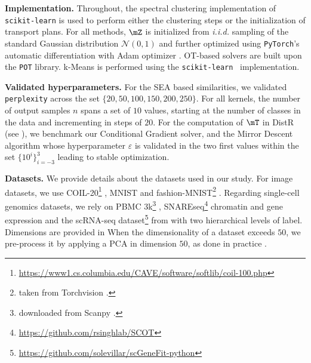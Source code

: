 \textbf{Implementation.} 
Throughout, the spectral clustering implementation of \texttt{scikit-learn} \cite{pedregosa2011scikit} is used to perform either the clustering steps or the initialization of transport plans. 
For all methods, $\mZ$ is initialized from \emph{i.i.d.} sampling of the standard Gaussian distribution $\mathcal{N}(0,1)$ and further optimized using \texttt{PyTorch}'s automatic differentiation \cite{paszke2017automatic} with Adam optimizer \cite{kingma2014adam}. OT-based solvers are built upon the \texttt{POT} \cite{flamary2021pot} library.
k-Means is performed using the \texttt{scikit-learn}~\cite{pedregosa2011scikit} implementation.

\textbf{Validated hyperparameters.} For the SEA based similarities, we validated \texttt{perplexity} across the set $\{20, 50, 100, 150, 200, 250\}$. For all kernels, the number of output samples $n$ spans a set of $10$ values, starting at the number of classes in the data and incrementing in steps of $20$. For the computation of $\mT$ in DistR (see ), we benchmark our Conditional Gradient solver, and the Mirror Descent algorithm whose hyperparameter $\varepsilon$ is validated in the two first values within the set $\{10^{i}\}_{i=-3}^3$ leading to stable optimization.

\textbf{Datasets.}
We provide details about the datasets used in our study. 
For image datasets, we use COIL-20\footnote{\url{https://www1.cs.columbia.edu/CAVE/software/softlib/coil-100.php}} \cite{nene1996columbia}, MNIST and fashion-MNIST\footnote{taken from Torchvision \cite{marcel2010torchvision}.} \cite{xiao2017fashion}. Regarding single-cell genomics datasets, we rely on PBMC 3k\footnote{downloaded from Scanpy \cite{wolf2018scanpy}.} \cite{wolf2018scanpy}, SNAREseq\footnote{\url{https://github.com/rsinghlab/SCOT}} chromatin and gene expression \cite{chen2019high} and the scRNA-seq dataset\footnote{\url{https://github.com/solevillar/scGeneFit-python}} from \cite{zeisel2015cell} with two hierarchical levels of label. 
Dimensions are provided in 
When the dimensionality of a dataset exceeds $50$, we pre-process it by applying a PCA in dimension $50$, as done in practice \cite{van2008visualizing}.

